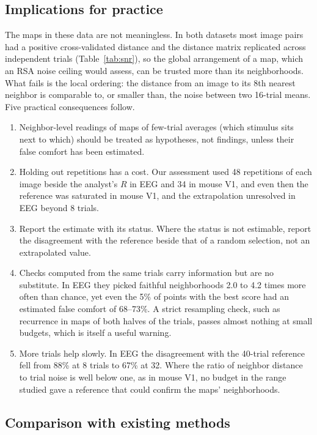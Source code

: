 \documentclass[11pt]{article}
\newcommand{\EegDEight}{88}
\newcommand{\EegDThirtyTwo}{67}
\newcommand{\BmEnrichLo}{2.0}
\newcommand{\BmEnrichHi}{4.2}
\newcommand{\BmFiveLo}{68}
\newcommand{\BmFiveHi}{73}
\begin{document}
\subsection{Implications for practice}

The maps in these data are not meaningless.
In both datasets most image pairs had a positive cross-validated distance and the distance matrix replicated across independent trials (Table~\ref{tab:snr}), so the global arrangement of a map, which an RSA noise ceiling would assess, can be trusted more than its neighborhoods.
What fails is the local ordering: the distance from an image to its 8th nearest neighbor is comparable to, or smaller than, the noise between two 16-trial means.
Five practical consequences follow.
\begin{enumerate}[leftmargin=*]
  \item Neighbor-level readings of maps of few-trial averages (which stimulus sits next to which) should be treated as hypotheses, not findings, unless their false comfort has been estimated.
  \item Holding out repetitions has a cost.
  Our assessment used 48 repetitions of each image beside the analyst's $R$ in EEG and 34 in mouse V1, and even then the reference was saturated in mouse V1, and the extrapolation unresolved in EEG beyond 8 trials.
  \item Report the estimate with its status.
  Where the status is not estimable, report the disagreement with the reference beside that of a random selection, not an extrapolated value.
  \item Checks computed from the same trials carry information but are no substitute.
  In EEG they picked faithful neighborhoods \BmEnrichLo{} to \BmEnrichHi{} times more often than chance, yet even the 5\% of points with the best score had an estimated false comfort of \BmFiveLo--\BmFiveHi\%.
  A strict resampling check, such as recurrence in maps of both halves of the trials, passes almost nothing at small budgets, which is itself a useful warning.
  \item More trials help slowly.
  In EEG the disagreement with the 40-trial reference fell from \EegDEight\% at 8 trials to \EegDThirtyTwo\% at 32.
  Where the ratio of neighbor distance to trial noise is well below one, as in mouse V1, no budget in the range studied gave a reference that could confirm the maps' neighborhoods.
\end{enumerate}

\subsection{Comparison with existing methods}
\end{document}
